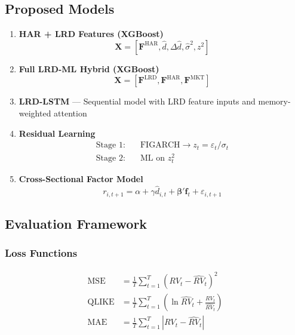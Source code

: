 \documentclass[11pt,a4paper]{article}
\theoremstyle{definition}
\newcommand{\dhat}{\hat{d}}
\newcommand{\sigmahat}{\hat{\sigma}}
\begin{document}
\subsection{Proposed Models}

\begin{enumerate}[label=\textbf{P\arabic*:}]
    \item \textbf{HAR + LRD Features (XGBoost)}
    \begin{equation}
        \mathbf{X} = \left[\mathbf{F}^{\text{HAR}}, \dhat, \Delta\dhat, \sigmahat^2, z^2\right]
    \end{equation}
    
    \item \textbf{Full LRD-ML Hybrid (XGBoost)}
    \begin{equation}
        \mathbf{X} = \left[\mathbf{F}^{\text{LRD}}, \mathbf{F}^{\text{HAR}}, \mathbf{F}^{\text{MKT}}\right]
    \end{equation}
    
    \item \textbf{LRD-LSTM} --- Sequential model with LRD feature inputs and memory-weighted attention
    
    \item \textbf{Residual Learning}
    \begin{align}
        \text{Stage 1:} \quad & \text{FIGARCH} \to z_t = \varepsilon_t/\sigma_t \\
        \text{Stage 2:} \quad & \text{ML on } z_t^2
    \end{align}
    
    \item \textbf{Cross-Sectional Factor Model}
    \begin{equation}
        r_{i,t+1} = \alpha + \gamma \dhat_{i,t} + \boldsymbol{\beta}'\mathbf{f}_t + \varepsilon_{i,t+1}
    \end{equation}
\end{enumerate}

\subsection{Evaluation Framework}

\subsubsection{Loss Functions}

\begin{align}
    \text{MSE} &= \frac{1}{T}\sum_{t=1}^T (RV_t - \widehat{RV}_t)^2 \\
    \text{QLIKE} &= \frac{1}{T}\sum_{t=1}^T \left(\ln\widehat{RV}_t + \frac{RV_t}{\widehat{RV}_t}\right) \\
    \text{MAE} &= \frac{1}{T}\sum_{t=1}^T |RV_t - \widehat{RV}_t|
\end{align}
\end{document}
